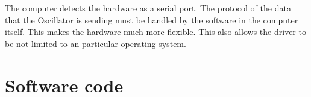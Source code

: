 \documentclass[12pt]{article}
\begin{document}
The computer detects the hardware as a serial port. The protocol of the data that the Oscillator is sending must be handled by the software in the computer itself. This makes the hardware much more flexible. This also allows the driver to be not limited to an particular operating system.

\newpage
\section{Software code}



\newpage
\end{document}
